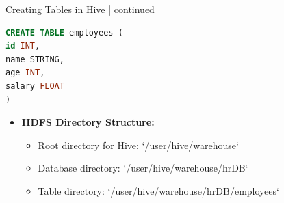\begin{frame}[fragile]{Creating Tables in Hive | continued}
\begin{lstlisting}[caption={Create Table employess in Hive under hrDB},language=SQL]
CREATE TABLE employees (
id INT,
name STRING,
age INT,
salary FLOAT
)
\end{lstlisting}
  
\begin{itemize}	
  \item \textbf{HDFS Directory Structure:}
  \begin{itemize}
	\item Root directory for Hive: `/user/hive/warehouse`
	\item Database directory: `/user/hive/warehouse/hrDB`
	\item Table directory: `/user/hive/warehouse/hrDB/employees`
  \end{itemize}
\end{itemize}  
  \end{frame}














































